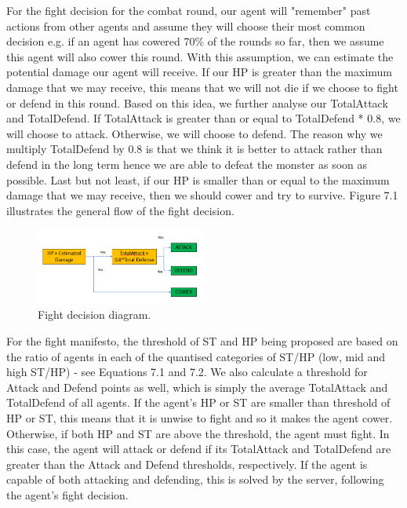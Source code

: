 \par For the fight decision for the combat round, our agent will "remember" past actions from other agents and assume they will choose their most common decision e.g. if an agent has cowered 70\% of the rounds so far, then we assume this agent will also cower this round. With this assumption, we can estimate the potential damage our agent will receive. If our HP is greater than the maximum damage that we may receive, this means that we will not die if we choose to fight or defend in this round. Based on this idea, we further analyse our TotalAttack and TotalDefend. If TotalAttack is greater than or equal to TotalDefend * 0.8, we will choose to attack. Otherwise, we will choose to defend. The reason why we multiply TotalDefend by 0.8 is that we think it is better to attack rather than defend in the long term hence we are able to defeat the monster as soon as possible. Last but not least, if our HP is smaller than or equal to the maximum damage that we may receive, then we should cower and try to survive. Figure 7.1 illustrates the general flow of the fight decision.

\begin{figure}
    \centering
    \includegraphics[width=0.5\textwidth]{007_team_4_agent_design/figures/1_fight1.png}
    \caption{Fight decision diagram.}
    \label{fig:proj_struct}
\end{figure}


\par For the fight manifesto, the threshold of ST and HP being proposed are based on the ratio of agents in each of the quantised categories of ST/HP (low, mid and high ST/HP) - see Equations 7.1 and 7.2. We also calculate a threshold for Attack and Defend points as well, which is simply the average TotalAttack and TotalDefend of all agents.
If the agent's HP or ST are smaller than threshold of HP or ST, this means that it is unwise to fight and so it makes the agent cower. Otherwise, if both HP and ST are above the threshold, the agent must fight. In this case, the agent will attack or defend if its TotalAttack and TotalDefend are greater than the Attack and Defend thresholds, respectively. If the agent is capable of both attacking and defending, this is solved by the server, following the agent's fight decision.

